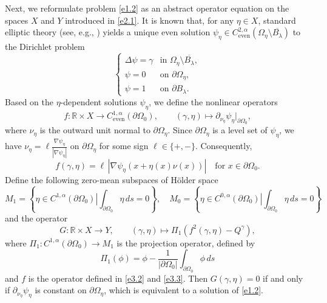 \documentclass[reqno]{amsart}
\numberwithin{equation}{section}
\numberwithin{equation}{section}
\numberwithin{equation}{section}
\begin{document}
Next, we reformulate problem \eqref{e1.2} as an abstract operator equation on the spaces \(X\) and \(Y\) introduced in \eqref{e2.1}.
It is known that, for any \(\eta \in X\), standard elliptic theory (see, e.g., \cite{Gilbarg}) yields a unique even solution \(\psi_\eta \in C_{\mathrm{even}}^{2,\alpha}(\Omega_\eta \setminus \overline{B_\lambda})\) to the Dirichlet problem
\begin{equation}\label{e3.1}
\begin{cases}
\Delta \psi = \gamma & \text{in } \Omega_\eta \setminus \overline{B_\lambda}, \\
\psi = 0 & \text{on } \partial \Omega_\eta, \\
\psi = 1 & \text{on } \partial B_\lambda.
\end{cases}
\end{equation}
Based on the \(\eta\)-dependent solutions \(\psi_\eta\), we define the nonlinear operators
\begin{equation}\label{e3.2}
f \colon \mathbb{R} \times X \to C_{\mathrm{even}}^{1,\alpha}(\partial \Omega_0), \qquad (\gamma, \eta) \mapsto \partial_{\nu_\eta} \psi_\eta \big|_{\partial \Omega_0},
\end{equation}
where \(\nu_\eta\) is the outward unit normal to \(\partial \Omega_\eta\). Since \(\partial \Omega_\eta\) is a level set of \(\psi_\eta\), we have \(\nu_\eta = \ell \frac{\nabla \psi_\eta}{|\nabla \psi_\eta|}\) on \(\partial \Omega_\eta\) for some sign \(\ell \in \{+,-\}\). Consequently,
\begin{equation}\label{e3.3}
f(\gamma,\eta) = \ell \, |\nabla \psi_\eta(x + \eta(x)\nu(x))| \quad \text{for } x \in \partial \Omega_0.
\end{equation}
 Define the following zero-mean subspaces of H\"{o}lder space
\begin{equation}\label{zy}
 M_1=\left\{\left. \eta \in C^{1,\alpha}(\partial \Omega_0) \right|\int_{\partial \Omega_0} \eta \, ds = 0 \right\}, \quad  M_0=\left\{\left. \eta \in C^{0,\alpha}(\partial \Omega_0) \right|\int_{\partial \Omega_0} \eta \, ds = 0 \right\}
\end{equation}
 and the operator
$$
G \colon \mathbb{R} \times X \to Y, \qquad (\gamma, \eta) \mapsto \Pi_1\left( f^2(\gamma, \eta) - Q^\gamma\right),
$$
where $\Pi_1:C^{1,\alpha}(\partial \Omega_0)\rightarrow M_1$ is the projection operator, defined by
$$
 \Pi_1(\phi)=\phi-\frac{1}{|\partial \Omega_0|}\int_{\partial \Omega_0}\phi\, ds
$$
and \(f\) is the operator defined in \eqref{e3.2} and \eqref{e3.3}. Then \(G(\gamma, \eta) = 0\) if and only if \(\partial_{\nu_\eta} \psi_\eta\) is constant on \(\partial \Omega_\eta\), which is equivalent to a solution of \eqref{e1.2}.
\end{document}
